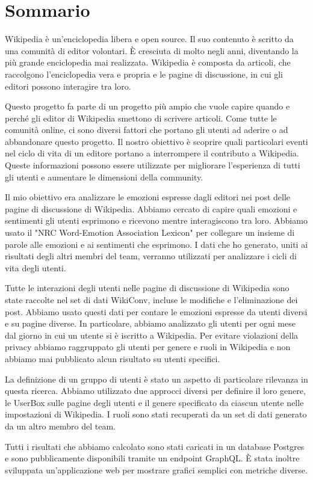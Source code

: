 \chapter*{Sommario} %
\label{Sommatio}


Wikipedia è un'enciclopedia libera e open source. Il suo contenuto è scritto da una comunità di editor volontari. È cresciuta di molto negli anni, diventando la più grande enciclopedia mai realizzata. Wikipedia è composta da articoli, che raccolgono l'enciclopedia vera e propria e le pagine di discussione, in cui gli editori possono interagire tra loro.

Questo progetto fa parte di un progetto più ampio che vuole capire quando e perché gli editor di Wikipedia smettono di scrivere articoli. Come tutte le comunità online, ci sono diversi fattori che portano gli utenti ad aderire o ad abbandonare questo progetto. Il nostro obiettivo è scoprire quali particolari eventi nel ciclo di vita di un editore portano a interrompere il contributo a Wikipedia. Queste informazioni possono essere utilizzate per migliorare l'esperienza di tutti gli utenti e aumentare le dimensioni della community.

Il mio obiettivo era analizzare le emozioni espresse dagli editori nei post delle pagine di discussione di Wikipedia. Abbiamo cercato di capire quali emozioni e sentimenti gli utenti esprimono e ricevono mentre interagiscono tra loro. Abbiamo usato il "NRC Word-Emotion Association Lexicon" per collegare un insieme di parole alle emozioni e ai sentimenti che esprimono. I dati che ho generato, uniti ai risultati degli altri membri del team, verranno utilizzati per analizzare i cicli di vita degli utenti.

Tutte le interazioni degli utenti nelle pagine di discussione di Wikipedia sono state raccolte nel set di dati WikiConv, incluse le modifiche e l'eliminazione dei post. Abbiamo usato questi dati per contare le emozioni espresse da utenti diversi e su pagine diverse. In particolare, abbiamo analizzato gli utenti per ogni mese dal giorno in cui un utente si è iscritto a Wikipedia. Per evitare violazioni della privacy abbiamo raggruppato gli utenti per genere e ruoli in Wikipedia e non abbiamo mai pubblicato alcun risultato su utenti specifici.

La definizione di un gruppo di utenti è stato un aspetto di particolare rilevanza in questa ricerca. Abbiamo utilizzato due approcci diversi per definire il loro genere, le UserBox sulle pagine degli utenti e il genere specificato da ciascun utente nelle impostazioni di Wikipedia. I ruoli sono stati recuperati da un set di dati generato da un altro membro del team.


Tutti i risultati che abbiamo calcolato sono stati caricati in un database Postgres e sono pubblicamente disponibili tramite un endpoint GraphQL. È stata inoltre sviluppata un'applicazione web per mostrare grafici semplici con metriche diverse.